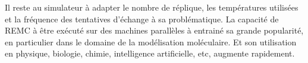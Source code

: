 Il reste au simulateur à adapter le nombre de réplique, les températures utilisées et la fréquence des tentatives d'échange à sa problématique. La capacité de REMC à être exécuté sur des machines parallèles à entrainé sa grande popularité, en particulier dans le domaine de la modélisation moléculaire. Et son utilisation en physique, biologie, chimie, intelligence artificielle, etc, augmente rapidement.


